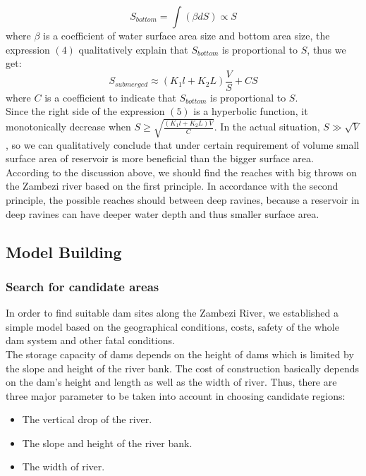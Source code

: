 \documentclass{mcmthesis}
\begin{document}
\begin{equation}
S_{bottom} = \int\left(\beta dS \right) \propto S
\end{equation}  
where $\beta$ is a coefficient of water surface area size and bottom area size, the expression $\left(4\right)$ qualitatively explain that $S_{bottom}$ is proportional to $S$, thus we get:\\
\begin{equation}
S_{submerged} \approx \left(K_{1}l + K_{2}L\right)\frac{V}{S} + CS
\end{equation}
where $C$ is a coefficient to indicate that $S_{bottom}$ is proportional to $S$.\\
\indent Since the right side of the expression $\left(5\right)$ is a hyperbolic function, it monotonically decrease when $S \geq \sqrt{\frac{\left(K_{1}l + K_{2}L\right)V}{C}}$. In the actual situation, $S \gg \sqrt{V}$, so we can qualitatively conclude that under certain requirement of volume small surface area of reservoir is more beneficial than the bigger surface area.\\
\indent According to the discussion above, we should find the reaches with big throws on the Zambezi river based on the first principle. In accordance with the second principle, the possible reaches should between deep ravines, because a reservoir in deep ravines can have deeper water depth and thus smaller surface area.


\subsection{Model Building}
\subsubsection{Search for candidate areas}
\indent \indent In order to find suitable dam sites along the Zambezi River, we established a simple model based on the geographical conditions, costs, safety of the whole dam system and other fatal conditions. \\
\indent The storage capacity of dams depends on the height of dams which is limited by the slope and height of the river bank. The cost of construction basically depends on the dam's height and length as well as the width of river. Thus, there are three major parameter to be taken into account in choosing candidate regions:
\begin{itemize}
\item The vertical drop of the river.
\item The slope and height of the river bank.
\item The width of river.
\end{itemize}
\end{document}
